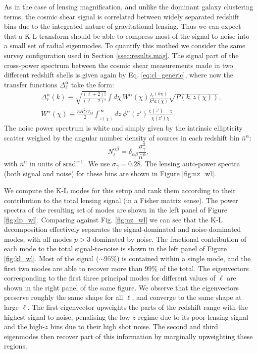 \documentclass[twocolumn,amsfont,amssymb,amsmath, showpacs,balancelastpage, nofootinbib]{revtex4-1}
\begin{document}
    As in the case of lensing magnification, and unlike the dominant galaxy clustering terms, the cosmic shear signal is correlated between widely separated redshift bins due to the integrated nature of gravitational lensing. Thus we can expect that a K-L transform should be able to compress most of the signal to noise into a small set of radial eigenmodes. To quantify this mothed we consider the same survey configuration used in Section \ref{ssec:results.mag}. The signal part of the cross-power spectrum between the cosmic shear measurements made in two different redshift shells is given again by Eq. \ref{eq:cl_generic}, where now the transfer functions $\Delta^{\alpha}_\ell$ take the form:
    \begin{align}\nonumber
      &\Delta^{\alpha}_\ell(k)\equiv\sqrt{\frac{(\ell+2)!}{(\ell-2)!}}\int d\chi\,W^\alpha(\chi)\frac{j_\ell(k\chi)}{k^2a(\chi)}\sqrt{P(k,z(\chi))},\\%
      &W^\alpha(\chi)\equiv\frac{3H_0^2\Omega_M}{2}\int_{z(\chi)}^\infty dz\,\phi^\alpha(z')\frac{\chi(z')-\chi}{\chi(z')\chi}.
    \end{align}
    The noise power spectrum is white and simply given by the intrinsic ellipticity scatter weighed by the angular number density of sources in each redshift bin $\bar{n}^\alpha$:
    \begin{equation}
      N^{\alpha\beta}_\ell=\delta_{\alpha\beta}\frac{\sigma_\gamma^2}{\bar{n}^\alpha},
    \end{equation}
    with $\bar{n}^\alpha$ in units of ${\rm srad}^{-1}$. We use $\sigma_\gamma=0.28$. The lensing auto-power spectra (both signal and noise) for these bins are shown in Figure \ref{fig:nz_wl}.
    
    We compute the K-L modes for this setup and rank them according to their contribution to the total lensing signal (in a Fisher matrix sense). The power spectra of the resulting set of modes are shown in the left panel of Figure \ref{fig:dp_wl}. Comparing against Fig. \ref{fig:nz_wl} we can see that the K-L decomposition effectively separates the signal-dominated and noise-dominated modes, with all modes $p>3$ dominated by noise. The fractional contribution of each mode to the total signal-to-noise is shown in the left panel of Figure \ref{fig:kl_wl}. Most of the signal ($\sim95\%$) is contained within a single mode, and the first two modes are able to recover more than $99\%$ of the total. The eigenvectors corresponding to the first three principal modes for different values of $\ell$ are shown in the right panel of the same figure. We observe that the eigenvectors preserve roughly the same shape for all $\ell$, and converge to the same shape at large $\ell$. The first eigenvector upweights the parts of the redshift range with the highest signal-to-noise, penalising the low-$z$ regime due to its poor lensing signal and the high-$z$ bins due to their high shot noise. The second and third eigenmodes then recover part of this information by marginally upweighting these regions.
    
\end{document}
